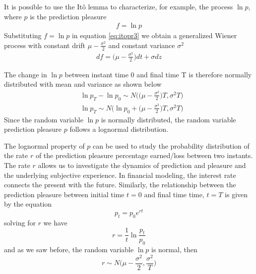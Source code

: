 \documentclass[11pt, onecolumn]{article}
\begin{document}
It is possible to use the  It\^{o} lemma to characterize, for example, the process $\ln p$, where $p$ is the prediction pleasure
\begin{equation*}
\begin{split}
  f = \ln p
\end{split}
\label{eq:slns}
\end{equation*} 
Substituting $f = \ln p$ in equation \ref{eq:itopr3} we obtain a generalized Wiener process with constant drift $\mu - \frac{\sigma^2}{2}$ and constant variance $\sigma^2$ 
\begin{equation*}
\begin{split}
df =  \bigg( \mu - \frac{\sigma^2}{2} \bigg)dt + \sigma dz
\end{split}
\label{eq:slns2}
\end{equation*} 

The change in $\ln p $ between instant time 0 and final time T is therefore normally distributed with mean and variance as shown below
\begin{equation*}
\begin{split}
 & \ln p_T - \ln p_0 \sim N \bigg( \big(\mu - \frac{\sigma ^2}{2} \big) T, \sigma^2 T \bigg) \\
 & \ln p_T  \sim N \bigg( \ln p_0 + \big(\mu - \frac{\sigma ^2}{2} \big) T, \sigma^2 T \bigg) 
\end{split}
\label{eq:slns3}
\end{equation*}
Since the random variable $\ln p$ is normally distributed, the random variable  prediction pleasure $p$ follows a lognormal distribution. 
%
%

The lognormal property of $p$ can be used to study the
probability distribution of the rate $r$ of the prediction pleasure percentage earned/loss between two instants. The rate $r$ allows us to investigate the dynamics of prediction and pleasure and the underlying subjective experience. 
In financial modeling, the interest rate connects the present with the future. Similarly, the relationship between the prediction pleasure between initial time $t = 0$ and final time time, $t=T$ is given by the equation
\begin{equation*}
   p_t = p_0 e^{r t}
\label{eq:vpbpt}
\end{equation*}
solving for $r$ we have
\begin{equation*}
   r = \frac{1}{t}\ln \frac{p_t}{p_0}
\label{eq:vpbpt2}
\end{equation*}
and as we saw before, the random variable $\ln p$ is normal, then   
\begin{equation}
   r \sim  N \bigg( \mu - \frac{\sigma ^2}{2} , \frac{\sigma^2}{T} \bigg) 
\label{eq:vpbpt3}
\end{equation}
\end{document}
